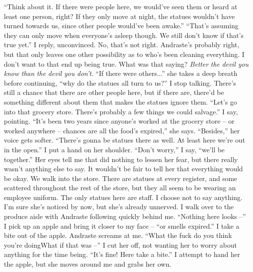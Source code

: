 \documentclass[a4paper, 12pt]{book}
\newcommand\tab[1][1cm]{\hspace*{#1}}
\begin{document}
\newline
\tab
``Think about it. If there were people here, we would’ve seen them or heard at least one person, right? If they only move at night, the statues wouldn’t have turned towards us, since other people would’ve been awake.''
\newline
\tab
``That’s assuming they can only move when everyone’s asleep though. We still don’t know if that’s true yet.'' I reply, unconvinced. No, that’s not right. Andraste’s probably right, but that only leaves one other possibility as to who’s been cleaning everything. I don’t want to that end up being true. What was that saying? \textit{Better the devil you know than the devil you don’t}.
\newline
\tab
``If there were others...'' she takes a deep breath before continuing, ``why do the statues all turn to us?'' I stop talking. There’s still a chance that there are other people here, but if there are, there’d be something different about them that makes the statues ignore them.
\newline
\tab
``Let’s go into that grocery store. There’s probably a few things we could salvage.'' I say, pointing.
\newline
\tab
``It’s been two years since anyone’s worked at the grocery store -- or worked anywhere -- chances are all the food’s expired,'' she says. ``Besides,'' her voice gets softer. ``There’s gonna be statues there as well. At least here we’re out in the open.''
\newline
\tab
I put a hand on her shoulder. ``Don’t worry,'' I say, ``we’ll be together.'' Her eyes tell me that did nothing to lessen her fear, but there really wasn’t anything else to say. It wouldn’t be fair to tell her that everything would be okay. We walk into the store. There are statues at every register, and some scattered throughout the rest of the store, but they all seem to be wearing an employee uniform. The only statues here are staff. I choose not to say anything. I’m sure she’s noticed by now, but she’s already unnerved. I walk over to the produce aisle with Andraste following quickly behind me. ``Nothing here looks --'' I pick up an apple and bring it closer to my face -- ``or smells expired.''
\newline
\tab
I take a bite out of the apple. Andraste screams at me. ``What the fuck do you think you’re doing\textinterrobang What if that was --'' I cut her off, not wanting her to worry about anything for the time being.
\newline
\tab
``It’s fine! Here take a bite.'' I attempt to hand her the apple, but she moves around me and grabs her own.
\end{document}
